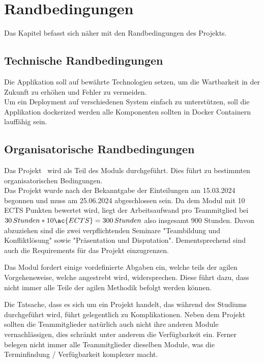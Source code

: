 \chapter{Randbedingungen}\label{ch:randbedingungen}

Das Kapitel befasst sich näher mit den Randbedingungen des Projekts.

\section{Technische Randbedingungen}\label{sec:technische-randbedingungen}

Die Applikation soll auf bewährte Technologien setzen, um die Wartbarkeit in der Zukunft zu erhöhen und Fehler zu vermeiden.\\
Um ein Deployment auf verschiedenen System einfach zu unterstützen, soll die Applikation dockerized werden
\dah alle Komponenten sollten in Docker Containern lauffähig sein.

\section{Organisatorische Randbedingungen}\label{sec:organisatorische-randbedingungen}

Das Projekt \workTitel~wird als Teil des Moduls \workTyp durchgeführt.
Dies führt zu bestimmten organisatorischen Bedingungen.\\
Das Projekt wurde nach der Bekanntgabe der Einteilungen am 15.03.2024 begonnen und muss am 25.06.2024 abgeschlossen sein.
Da dem Modul mit 10 \ac{ECTS} Punkten bewertet wird, liegt der Arbeitsaufwand pro Teammitglied bei \(30\,Stunden * 10 \ac{ECTS} = 300\,Stunden\) also insgesamt 900 Stunden.
Davon abzuziehen sind die zwei verpflichtenden Seminare "Teambildung und Konfliktlösung" sowie "Präsentation und Disputation".
Dementsprechend sind auch die Requirements für das Projekt einzugrenzen.

Das Modul fordert einige vordefinierte Abgaben ein, welche teils der agilen Vorgehensweise, welche angestrebt wird, widersprechen.
Diese führt dazu, dass nicht immer alle Teile der agilen Methodik befolgt werden können.

Die Tatsache, dass es sich um ein Projekt handelt, das während des Studiums durchgeführt wird, führt gelegentlich zu Komplikationen.
Neben dem Projekt sollten die Teammitglieder natürlich auch nicht ihre anderen Module vernachlässigen, dies schränkt unter anderem die Verfügbarkeit ein.
Ferner belegen nicht immer alle Teammitglieder dieselben Module, was die Terminfindung / Verfügbarkeit komplexer macht.